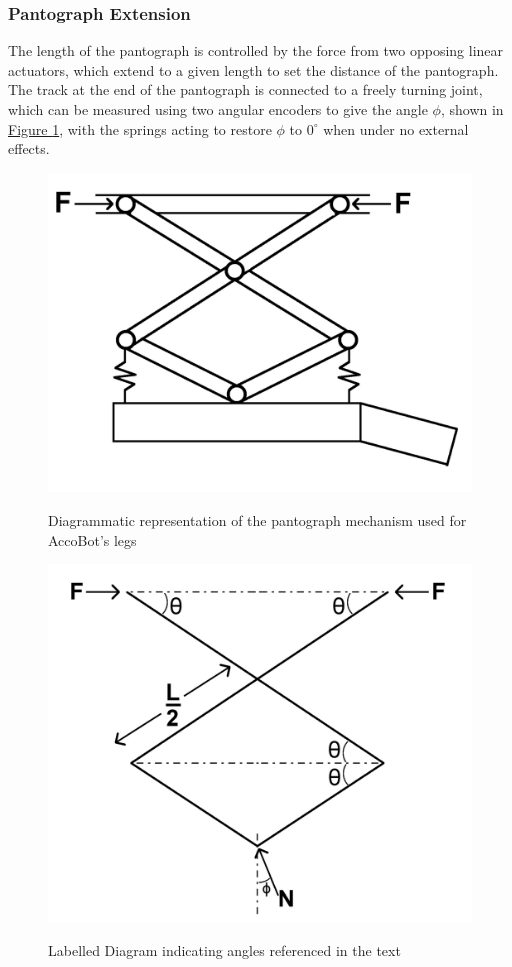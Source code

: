 \documentclass[11pt]{article}		%
\newlength{\imageheight}	 %
\newcommand{\figref}[1]{\hyperref[#1]{Figure \ref*{#1}}}    %
\begin{document}
			\subsubsection{Pantograph Extension}
				The length of the pantograph is controlled by the force from two opposing linear actuators, which extend to a given length to set the distance of the pantograph.
				The track at the end of the pantograph is connected to a freely turning joint, which can be measured using two angular encoders to give the angle $\phi$, shown in \figref{legDiagram}, with the springs acting to restore $\phi$ to $0^\circ$ when under no external effects.
				\\
				\begin{figure}[h]
    				\centering
    				\begin{multicols}{2}
    					\includegraphics[height=\imageheight]{legDesign}
    					\caption{Diagrammatic representation of the pantograph mechanism used for AccoBot's legs}
    					\label{legDesign}
    					\columnbreak
    					\includegraphics[height=\imageheight]{legDiagram}
    					\caption{Labelled Diagram indicating angles referenced in the text}
    					\label{legDiagram}
    				\end{multicols}
    			\end{figure}
\end{document}
